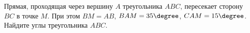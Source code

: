 \begin{ex}
	\begin{condition}
		Прямая, проходящая через вершину \( A  \) треугольника \( ABC \), пересекает сторону \( BC  \) в точке \( M  \). При этом \( BM = AB \), \( BAM = 35\degree \), \( CAM = 15\degree \). Найдите углы треугольника \( ABC \).
	\end{condition}
\end{ex}